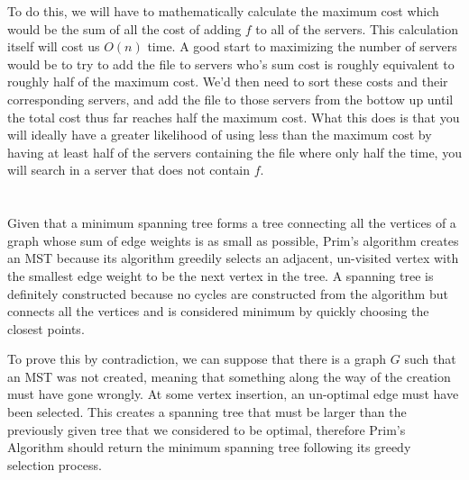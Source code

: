 \documentclass[12pt]{article}
\begin{document}
\noindent To do this, we will have to mathematically calculate the maximum cost which would be the sum of all the cost of adding \(f\) to all of the servers. This calculation itself will cost us \(O(n)\) time. A good start to maximizing the number of servers would be to try to add the file to servers who's sum cost is roughly equivalent to roughly half of the maximum cost. We'd then need to sort these costs and their corresponding servers, and add the file to those servers from the bottow up until the total cost thus far reaches half the maximum cost. What this does is that you will ideally have a greater likelihood of using less than the maximum cost by having at least half of the servers containing the file where only half the time, you will search in a server that does not contain \(f\). 

\section{}
Given that a minimum spanning tree forms a tree connecting all the vertices of a graph whose sum of edge weights is as small as possible, Prim's algorithm creates an MST because its algorithm greedily selects an adjacent, un-visited vertex with the smallest edge weight to be the next vertex in the tree. A spanning tree is definitely constructed because no cycles are constructed from the algorithm but connects all the vertices and is considered minimum by quickly choosing the closest points.\newline

\noindent To prove this by contradiction, we can suppose that there is a graph \(G\) such that an MST was not created, meaning that something along the way of the creation must have gone wrongly. At some vertex insertion, an un-optimal edge must have been selected. This creates a spanning tree that must be larger than the previously given tree that we considered to be optimal, therefore Prim's Algorithm should return the minimum spanning tree following its greedy selection process.
\end{document}
